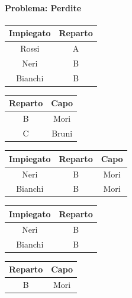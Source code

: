 \documentclass[../main.tex]{subfiles}
\begin{document}
	\paragraph{Problema: Perdite}
	\begin{center}
		\begin{tabular}{ |c|c| }
			\hline
			\textbf{Impiegato} & \textbf{Reparto}\\
			\hline
			Rossi & A\\
			Neri & B\\
			Bianchi & B\\
			\hline
		\end{tabular}
		\begin{tabular}{ |c|c| }
			\hline
			\textbf{Reparto} & \textbf{Capo}\\
			\hline
			B & Mori \\
			C & Bruni \\
			\hline
		\end{tabular}
	\end{center}
	\begin{center}
		\begin{tabular}{ |c|c|c| }
			\hline
			\textbf{Impiegato} & \textbf{Reparto} & \textbf{Capo}\\
			\hline
			Neri & B & Mori\\
			Bianchi & B & Mori\\
			\hline
		\end{tabular}
	\end{center}
	\begin{center}
		\begin{tabular}{ |c|c| }
			\hline
			\textbf{Impiegato} & \textbf{Reparto}\\
			\hline
			Neri & B\\
			Bianchi & B\\
			\hline
		\end{tabular}
		\begin{tabular}{ |c|c| }
			\hline
			\textbf{Reparto} & \textbf{Capo}\\
			\hline
			B & Mori \\
			\hline
		\end{tabular}
	\end{center}
\end{document}
